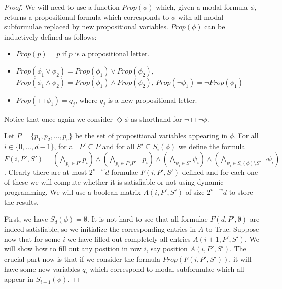 \documentclass{llncs}
\begin{document}
\begin{proof}



We will need to use a function $Prop(\phi)$ which, given a modal formula
$\phi$, returns a propositional formula which corresponds to $\phi$ with all
modal subformulae replaced by new propositional variables. $Prop(\phi)$ can be
inductively defined as follows:

\begin{itemize}

\item $Prop(p)=p$ if $p$ is a propositional letter.

\item $Prop(\phi_1\lor \phi_2) = Prop(\phi_1) \lor Prop(\phi_2)$,
  $Prop(\phi_1\land\phi_2) = Prop(\phi_1) \land Prop(\phi_2)$,
  $Prop(\neg \phi_1) = \neg Prop(\phi_1)$

\item $Prop(\Box \phi_1) = q_j$, where $q_j$ is
a new propositional letter.

\end{itemize}

Notice that once again we consider $\Diamond \phi$ as shorthand
for $\neg \Box \neg \phi$.

Let $P=\{p_1, p_2, \ldots, p_v\}$ be the set of propositional
variables appearing in $\phi$. For all $i\in \{0,\ldots,d-1\}$, for
all $P'\subseteq P$ and for all $S'\subseteq S_i(\phi)$ we define
the formula $F(i,P',S')=\left(\bigwedge_{p_i\in P'}p_i\right) \land
\left(\bigwedge_{p_i\in P\setminus P'} \neg p_i \right) \land
\left(\bigwedge_{\psi_i\in S'}\psi_i\right) \land
\left(\bigwedge_{\psi_i\in S_i(\phi)\setminus S'} \neg \psi_i
\right) $. Clearly there are at most $2^{v+w}d$ formulae
$F(i,P',S')$ defined and for each one of these we will compute
whether it is satisfiable or not using dynamic programming. We will
use a boolean matrix $A(i,P',S')$ of size $2^{v+w}d$ to store the results.

First, we have $S_d(\phi)=\emptyset$. It is not hard to see that all
formulae $F(d,P',\emptyset)$ are indeed satisfiable, so we initialize the
corresponding entries in $A$ to True. Suppose now that for some $i$ we have
filled out completely all entries $A(i+1,P',S')$. We will show how to fill out
any position in row $i$, say position $A(i,P',S')$. The crucial part now is that
if we consider the formula $Prop(F(i,P',S'))$, it will have some new variables
$q_i$ which correspond to modal subformulae which all appear in $S_{i+1}(\phi)$.


\end{proof}
\end{document}
